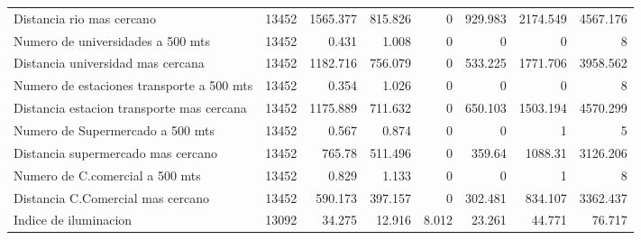 \begin{table}[!htbp]
{\begin{tabular}{lrrrrrrr}
Distancia rio mas cercano & 13452 & 1565.377 & 815.826 & 0 & 929.983 & 2174.549 & 4567.176 \\ 
Numero de universidades a 500 mts & 13452 & 0.431 & 1.008 & 0 & 0 & 0 & 8 \\ 
Distancia universidad mas cercana & 13452 & 1182.716 & 756.079 & 0 & 533.225 & 1771.706 & 3958.562 \\ 
Numero de estaciones transporte a 500 mts & 13452 & 0.354 & 1.026 & 0 & 0 & 0 & 8 \\ 
Distancia estacion transporte mas cercana & 13452 & 1175.889 & 711.632 & 0 & 650.103 & 1503.194 & 4570.299 \\ 
Numero de Supermercado a 500 mts & 13452 & 0.567 & 0.874 & 0 & 0 & 1 & 5 \\ 
Distancia supermercado mas cercano & 13452 & 765.78 & 511.496 & 0 & 359.64 & 1088.31 & 3126.206 \\ 
Numero de C.comercial a 500 mts & 13452 & 0.829 & 1.133 & 0 & 0 & 1 & 8 \\ 
Distancia C.Comercial mas cercano & 13452 & 590.173 & 397.157 & 0 & 302.481 & 834.107 & 3362.437 \\ 
Indice de iluminacion & 13092 & 34.275 & 12.916 & 8.012 & 23.261 & 44.771 & 76.717\\ 
\hline
\hline
\end{tabular}
}
\end{table}

